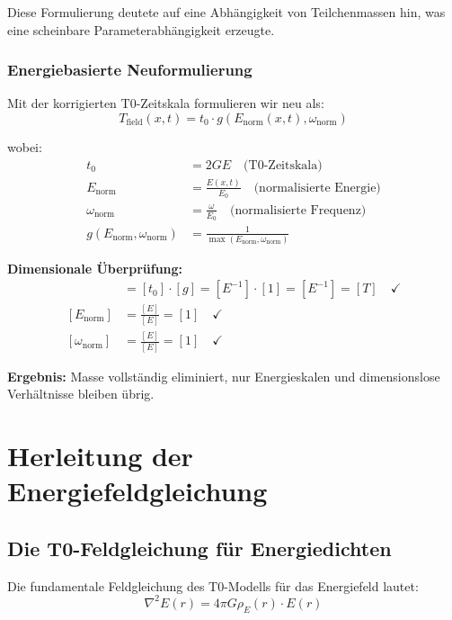 \documentclass[12pt,a4paper]{report}
\newcommand{\tzero}{t_0}                  %
\begin{document}
	Diese Formulierung deutete auf eine Abhängigkeit von Teilchenmassen hin, was eine scheinbare Parameterabhängigkeit erzeugte.
	
	\subsubsection{Energiebasierte Neuformulierung}
	
	Mit der korrigierten T0-Zeitskala formulieren wir neu als:
	\begin{equation}
		\boxed{T_{\text{field}}(x,t) = \tzero \cdot g(E_{\text{norm}}(x,t), \omega_{\text{norm}})}
		\label{eq:time_field_energy_based}
	\end{equation}
	
	wobei:
	\begin{align}
		\tzero &= 2GE \quad \text{(T0-Zeitskala)} \\
		E_{\text{norm}} &= \frac{E(x,t)}{E_0} \quad \text{(normalisierte Energie)} \\
		\omega_{\text{norm}} &= \frac{\omega}{E_0} \quad \text{(normalisierte Frequenz)} \\
		g(E_{\text{norm}}, \omega_{\text{norm}}) &= \frac{1}{\max(E_{\text{norm}}, \omega_{\text{norm}})}
	\end{align}
	
	\textbf{Dimensionale Überprüfung:}
	\begin{align}
		[T_{\text{field}}] &= [\tzero] \cdot [g] = [E^{-1}] \cdot [1] = [E^{-1}] = [T] \quad \checkmark \\
		[E_{\text{norm}}] &= \frac{[E]}{[E]} = [1] \quad \checkmark \\
		[\omega_{\text{norm}}] &= \frac{[E]}{[E]} = [1] \quad \checkmark
	\end{align}
	
	\textbf{Ergebnis:} Masse vollständig eliminiert, nur Energieskalen und dimensionslose Verhältnisse bleiben übrig.
	
	\section{Herleitung der Energiefeldgleichung}
	\label{sec:energy_field_equation}
	
	\subsection{Die T0-Feldgleichung für Energiedichten}
	\label{subsec:field_equation_energy}
	
	Die fundamentale Feldgleichung des T0-Modells für das Energiefeld lautet:
	\begin{equation}
		\nabla^2 E(r) = 4\pi G \rho_E(r) \cdot E(r)
		\label{eq:t0_field_equation_energy}
	\end{equation}
	
\end{document}
